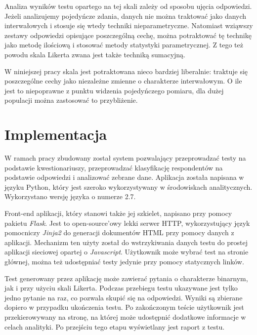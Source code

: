 \documentclass[12pt,a4paper,oneside]{report} %
\begin{document}
Analiza wyników testu opartego na tej skali zależy od sposobu ujęcia odpowiedzi. Jeżeli analizujemy pojedyńcze zdania, danych nie można traktować jako danych interwałowych i stosuje się wtedy techniki nieparametryczne. Natomiast wziąwszy zestawy odpowiedzi opisujące poszczególną cechę, można potraktować tę technikę jako metodę ilościową i stosować metody statystyki parametrycznej. \cite{joe} Z tego też powodu skala Likerta zwana jest także techniką sumacyjną. \par

W niniejszej pracy skala jest potraktowana nieco bardziej liberalnie: traktuje się poszczególne cechy jako niezależne zmienne o charakterze interwałowym. O ile jest to niepoprawne z punktu widzenia pojedyńczego pomiaru, dla dużej populacji można zastosować to przybliżenie. \par




\chapter{Implementacja}

W ramach pracy zbudowany został system pozwalający przeprowadzać testy na podstawie kwestionariuszy, przeprowadzać klasyfikację respondentów na podstawie odpowiedzi i analizować zebrane dane. Aplikacja została napisana w języku Python, który jest szeroko wykorzystywany w środowiskach analitycznych. Wykorzystano wersję języka o numerze 2.7.\par

Front-end aplikacji, który stanowi także jej szkielet, napisano przy pomocy pakietu \emph{Flask}. Jest to open-source'owy lekki serwer HTTP, wykorzystujący język pomocniczy \emph{Jinja2} do generacji dokumentów HTML przy pomocy danych z aplikacji. Mechanizm ten użyty został do wstrzykiwania danych testu do prostej aplikacji sieciowej opartej o \emph{Javascript}. Użytkownik może wybrać test na stronie głównej, można też udostępniać testy jedynie przy pomocy statycznych linków.\par

Test generowany przez aplikację może zawierać pytania o charakterze binarnym, jak i przy użyciu skali Likerta. Podczas przebiegu testu ukazywane jest tylko jedno pytanie na raz, co pozwala skupić się na odpowiedzi. Wyniki są zbierane dopiero w przypadku ukończenia testu. Po zakończonym teście użytkownik jest przekierowywany na stronę, na której może udostępnić dodatkowe informacje w celach analityki. Po przejściu tego etapu wyświetlany jest raport z testu.\par
\end{document}
